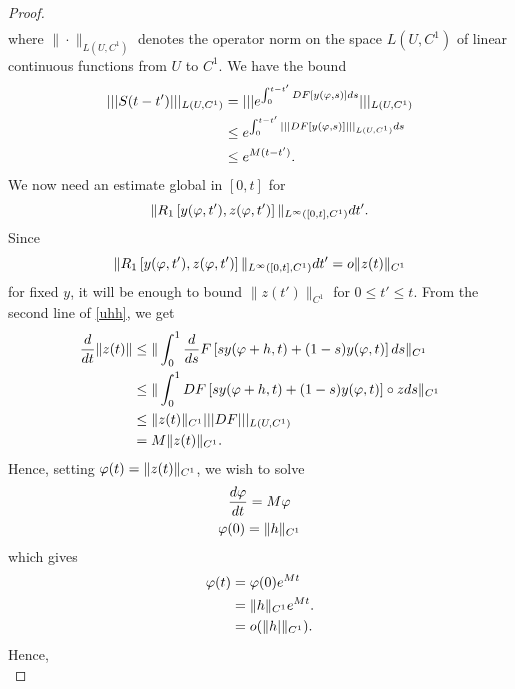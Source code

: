 \begin{proof}
\begin{equation}
\begin{split}
\end{split}
\end{equation}
%
%
where $\| \cdot \|_{L(U, C^{1})}$ denotes the operator norm on the space
$L(U,C^{1})$ of linear continuous functions from $U$ to $C^{1}$. We have the bound
%
%
\begin{equation}
  \label{op-norm}
\begin{split}
  | | | S(t-t') | | |_{L(U, C^{1})} 
  & = | | | e^{\int_{0}^{t-t'} DF \left[ y(\varphi,s)
  \right] ds} | | |_{L(U, C^{1})}
  \\\
  & \le e^{\int_{0}^{t-t'} | | | DF\left[ y(\varphi,s) \right]| | |_{L(U, C^{1})}ds} 
  \\
  & \le e^{M(t-t')}.
\end{split}
\end{equation}
%
%
We now need an estimate global in $[0,t]$ for
$$ \| R_{1}\left[ y(\varphi,t'), z(\varphi,t')
\right] \|_{L^{\infty}\left( [0,t], C^{1} \right)} dt'.$$ Since 
$$ \| R_{1}\left[ y(\varphi,t'), z(\varphi,t')
\right] \|_{L^{\infty}\left( [0,t], C^{1} \right)} dt' = o\| z(t)
\|_{C^{1}}$$ for fixed
$y$, it will be enough to bound $\| z(t') \|_{C^{1}}$ for $0 \le t' \le t$. From the
second line of \eqref{uhh}, we get
%
%
\begin{equation*}
\begin{split}
\frac{d}{dt} \| z(t) \|
& \le \| \int_{0}^{1} \frac{d}{ds} F\left[ sy(\varphi+h, t) + (1-s)y(\varphi,t) \right]ds
\|_{C^{1}}
\\
& \le \| \int_{0}^{1} DF\left[  sy(\varphi+h, t) + (1-s)y(\varphi,t) \right] \circ z ds
\|_{C^{1}}
\\
& \le \| z(t) \|_{C^{1}} | | | DF | | |_{L(U, C^{1})}
\\
& = M \| z(t) \|_{C^{1}}.
\end{split}
\end{equation*}
%
%
Hence, setting $\varphi(t) =  \| z(t) \|_{C^{1}}$, we wish to solve
%
%
\begin{gather*}
\frac{d \varphi}{dt} = M \varphi
\\
\varphi(0) = \| h \|_{C^{1}}
\end{gather*}
%
%
which gives
%
%
\begin{equation*}
\begin{split}
  \varphi(t) & = \varphi(0)e^{Mt}
  \\
  & = \| h \|_{C^{1}} e^{Mt}.
  \\
  & = o(\|h|\|_{C^{1}}).
\end{split}
\end{equation*}
%
%
Hence,
%
%
\begin{equation*}

\end{equation*}
\end{proof}
